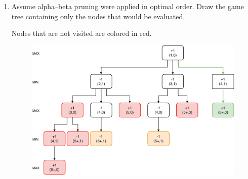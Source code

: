 \documentclass[9pt,a4paper]{extarticle}
\newenvironment{solution}
    {%
    \color{red}
    }
    { 
    \color{black}
    }
\begin{document}
\begin{enumerate}
\begin{enumerate}
        \item Assume alpha–beta pruning were applied in optimal order. Draw the game tree containing only the nodes that would be evaluated.
        
        \begin{solution}
            Nodes that are not visited are colored in red.
            \begin{figure}[h]
                \centering
                \includegraphics[width=.775\textwidth]{figures/alpha_beta_tree.pdf}
            \end{figure}
        \end{solution}
    \end{enumerate}
\end{enumerate}
   
\end{document}
